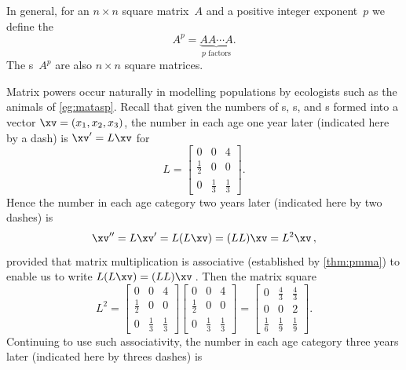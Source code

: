 In general, for an \(n\times n\) square matrix~\(A\) and a positive integer exponent~\(p\) we define the 
\begin{equation*}
A^p=\underbrace{AA\cdots A}_{p\text{ factors}}.
\end{equation*}
The s~\(A^p\) are also \(n\times n\) square matrices.


\begin{example} \label{eg:poppred}
Matrix powers occur naturally in modelling populations by ecologists such as the animals of \cref{eg:matasp}.
Recall that given the numbers of  s, s, and s formed into a vector \(\xv=(x_1,x_2,x_3)\), the number in each age one year later (indicated here by a dash) is \(\xv'=L\xv\) for 
\begin{equation*}
L=\begin{bmatrix} 0&0&4\\\frac12&0&0\\0&\frac13&\frac13 \end{bmatrix}.
\end{equation*}
Hence the number in each age category two years later (indicated here by two dashes) is
\begin{equation*}
\xv''=L\xv'=L(L\xv)=(LL)\xv=L^2\xv\,,
\end{equation*}
provided that matrix multiplication is associative (established by \cref{thm:pmma}) to enable us to write \(L(L\xv)=(LL)\xv\)\,.
Then the matrix square
\begin{equation*}
L^2=\begin{bmatrix} 0&0&4\\\frac12&0&0\\0&\frac13&\frac13 \end{bmatrix}\begin{bmatrix} 0&0&4\\\frac12&0&0\\0&\frac13&\frac13 \end{bmatrix}
=\begin{bmatrix} 0&\frac43&\frac43\\0&0&2\\\frac16&\frac19&\frac19 \end{bmatrix}.
\end{equation*}
Continuing to use such associativity, 
the number in each age category three years later (indicated here by threes dashes) is
\begin{equation*}

\end{equation*}
\end{example}
